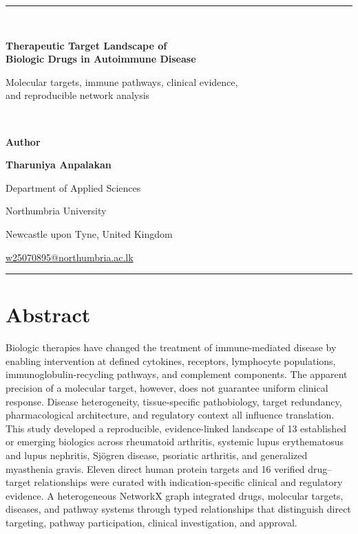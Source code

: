 \documentclass[12pt,a4paper]{article}
\begin{document}
\begin{titlepage}
\thispagestyle{empty}\centering\vspace*{24mm}
{\color{navy}\rule{0.88\textwidth}{1.4pt}}\\[18mm]
{\fontsize{25}{31}\selectfont\bfseries\color{navy}Therapeutic Target Landscape of\\[3mm]Biologic Drugs in Autoimmune Disease\par}
\vspace{9mm}
{\large\color{darkgray}Molecular targets, immune pathways, clinical evidence,\\and reproducible network analysis\par}
\vspace{18mm}{\color{steel}\rule{0.42\textwidth}{0.8pt}}\\[16mm]
{\large\textbf{Author}\par}\vspace{4mm}
{\Large\textbf{Tharuniya Anpalakan}\par}\vspace{7mm}
{\large Department of Applied Sciences\par}
{\large Northumbria University\par}
{\large Newcastle upon Tyne, United Kingdom\par}\vspace{5mm}
{\large\href{mailto:w25070895@northumbria.ac.lk}{w25070895@northumbria.ac.lk}\par}
\vfill{\color{navy}\rule{0.88\textwidth}{1.4pt}}
\end{titlepage}

\section*{Abstract}
Biologic therapies have changed the treatment of immune-mediated disease by enabling intervention at defined cytokines, receptors, lymphocyte populations, immunoglobulin-recycling pathways, and complement components. The apparent precision of a molecular target, however, does not guarantee uniform clinical response. Disease heterogeneity, tissue-specific pathobiology, target redundancy, pharmacological architecture, and regulatory context all influence translation. This study developed a reproducible, evidence-linked landscape of 13 established or emerging biologics across rheumatoid arthritis, systemic lupus erythematosus and lupus nephritis, Sjögren disease, psoriatic arthritis, and generalized myasthenia gravis. Eleven direct human protein targets and 16 verified drug--target relationships were curated with indication-specific clinical and regulatory evidence. A heterogeneous NetworkX graph integrated drugs, molecular targets, diseases, and pathway systems through typed relationships that distinguish direct targeting, pathway participation, clinical investigation, and approval.
\end{document}
